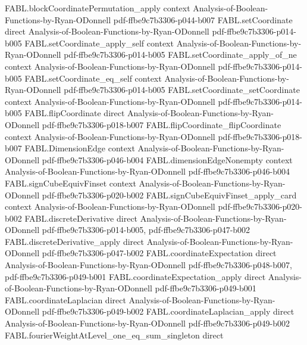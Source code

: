 \begin{theorem}
\proofstep
  {FABL.blockCoordinatePermutation_apply}
  {context}
  {Analysis-of-Boolean-Functions-by-Ryan-ODonnell}
  {pdf-ffbe9c7b3306-p044-b007}
\proofstep
  {FABL.setCoordinate}
  {direct}
  {Analysis-of-Boolean-Functions-by-Ryan-ODonnell}
  {pdf-ffbe9c7b3306-p014-b005}
\proofstep
  {FABL.setCoordinate_apply_self}
  {context}
  {Analysis-of-Boolean-Functions-by-Ryan-ODonnell}
  {pdf-ffbe9c7b3306-p014-b005}
\proofstep
  {FABL.setCoordinate_apply_of_ne}
  {context}
  {Analysis-of-Boolean-Functions-by-Ryan-ODonnell}
  {pdf-ffbe9c7b3306-p014-b005}
\proofstep
  {FABL.setCoordinate_eq_self}
  {context}
  {Analysis-of-Boolean-Functions-by-Ryan-ODonnell}
  {pdf-ffbe9c7b3306-p014-b005}
\proofstep
  {FABL.setCoordinate_setCoordinate}
  {context}
  {Analysis-of-Boolean-Functions-by-Ryan-ODonnell}
  {pdf-ffbe9c7b3306-p014-b005}
\proofstep
  {FABL.flipCoordinate}
  {direct}
  {Analysis-of-Boolean-Functions-by-Ryan-ODonnell}
  {pdf-ffbe9c7b3306-p018-b007}
\proofstep
  {FABL.flipCoordinate_flipCoordinate}
  {context}
  {Analysis-of-Boolean-Functions-by-Ryan-ODonnell}
  {pdf-ffbe9c7b3306-p018-b007}
\proofstep
  {FABL.DimensionEdge}
  {context}
  {Analysis-of-Boolean-Functions-by-Ryan-ODonnell}
  {pdf-ffbe9c7b3306-p046-b004}
\proofstep
  {FABL.dimensionEdgeNonempty}
  {context}
  {Analysis-of-Boolean-Functions-by-Ryan-ODonnell}
  {pdf-ffbe9c7b3306-p046-b004}
\proofstep
  {FABL.signCubeEquivFinset}
  {context}
  {Analysis-of-Boolean-Functions-by-Ryan-ODonnell}
  {pdf-ffbe9c7b3306-p020-b002}
\proofstep
  {FABL.signCubeEquivFinset_apply_card}
  {context}
  {Analysis-of-Boolean-Functions-by-Ryan-ODonnell}
  {pdf-ffbe9c7b3306-p020-b002}
\proofstep
  {FABL.discreteDerivative}
  {direct}
  {Analysis-of-Boolean-Functions-by-Ryan-ODonnell}
  {pdf-ffbe9c7b3306-p014-b005,
    pdf-ffbe9c7b3306-p047-b002}
\proofstep
  {FABL.discreteDerivative_apply}
  {direct}
  {Analysis-of-Boolean-Functions-by-Ryan-ODonnell}
  {pdf-ffbe9c7b3306-p047-b002}
\proofstep
  {FABL.coordinateExpectation}
  {direct}
  {Analysis-of-Boolean-Functions-by-Ryan-ODonnell}
  {pdf-ffbe9c7b3306-p048-b007,
    pdf-ffbe9c7b3306-p049-b001}
\proofstep
  {FABL.coordinateExpectation_apply}
  {direct}
  {Analysis-of-Boolean-Functions-by-Ryan-ODonnell}
  {pdf-ffbe9c7b3306-p049-b001}
\proofstep
  {FABL.coordinateLaplacian}
  {direct}
  {Analysis-of-Boolean-Functions-by-Ryan-ODonnell}
  {pdf-ffbe9c7b3306-p049-b002}
\proofstep
  {FABL.coordinateLaplacian_apply}
  {direct}
  {Analysis-of-Boolean-Functions-by-Ryan-ODonnell}
  {pdf-ffbe9c7b3306-p049-b002}
\proofstep
  {FABL.fourierWeightAtLevel_one_eq_sum_singleton}
  {direct}

\end{theorem}
